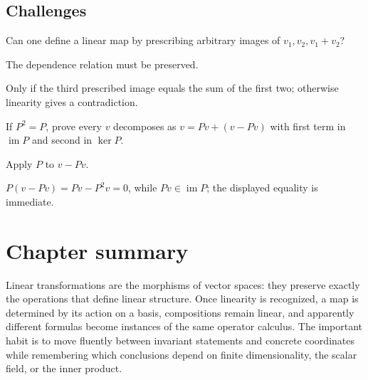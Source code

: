\subsection*{Challenges}

\begin{exercise}\label{exr:i05-expand-15}
Can one define a linear map by prescribing arbitrary images of \(v_1,v_2,v_1+v_2\)?
\end{exercise}
\begin{hint}
The dependence relation must be preserved.
\end{hint}
\begin{solution}
Only if the third prescribed image equals the sum of the first two; otherwise linearity gives a contradiction.
\end{solution}

\begin{exercise}\label{exr:i05-expand-16}
If \(P^2=P\), prove every \(v\) decomposes as \(v=Pv+(v-Pv)\) with first term in \(\operatorname{im}P\) and second in \(\ker P\).
\end{exercise}
\begin{hint}
Apply \(P\) to \(v-Pv\).
\end{hint}
\begin{solution}
\(P(v-Pv)=Pv-P^2v=0\), while \(Pv\in\operatorname{im}P\); the displayed equality is immediate.
\end{solution}
\section*{Chapter summary}
Linear transformations are the morphisms of vector spaces: they preserve exactly the operations that define linear structure. Once linearity is recognized, a map is determined by its action on a basis, compositions remain linear, and apparently different formulas become instances of the same operator calculus.
The important habit is to move fluently between invariant statements and concrete coordinates while remembering which conclusions depend on finite dimensionality, the scalar field, or the inner product.
